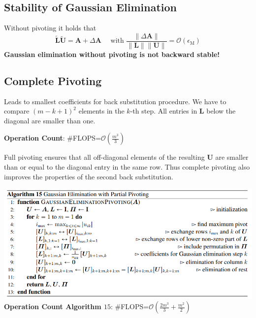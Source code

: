 \documentclass[english]{latex4ei/latex4ei_sheet}
\begin{document}
\begin{sectionbox}
\begin{sectionbox}
\subsection{Stability of Gaussian Elimination}
Without pivoting it holds that
$$\tilde{\mathbf{L}}\tilde{\mathbf{U}} = \mathbf{A} + \Delta\mathbf{A}\quad \text{ with } \frac{\parallel \Delta \mathbf{A} \parallel}{\parallel\mathbf{L}\parallel\parallel\mathbf{U}\parallel} = \mathcal{O}(\epsilon_\text{M})$$
\textbf{Gaussian elimination without pivoting is not backward stable!}
\end{sectionbox}
\subsection{Complete Pivoting}
Leads to smallest coefficients for back substitution procedure. We have to compare $(m-k+1)^2$ elements in the $k$-th step. All entries in $\mathbf{L}$ below the diagonal are smaller than one.
\begin{emphbox}
	\large \textbf{Operation Count}: \#FLOPS=$\mathcal{O}(\frac{m^3}{3})$\\
\end{emphbox}
Full pivoting ensures that all off-diagonal elements of the resulting $\mathbf{U}$ are smaller than or equal to the diagonal entry in the same row. Thus complete pivoting also improves the properties of the second back substitution.
\end{sectionbox}
\begin{sectionbox}
	\includegraphics[width=\textwidth]{img/algo15_gauss_partial_pivoting.PNG}
	\textbf{Operation Count Algorithm $15$}: \#FLOPS=$\mathcal{O}(\frac{2m^3}{3} + \frac{m^2}{2})$\\
\end{sectionbox}
\end{document}
